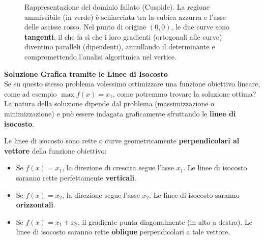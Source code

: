 \documentclass[12pt, a4paper]{article}
\begin{document}
	\begin{figure}[H]
		\centering
		\caption{Rappresentazione del dominio fallato (Cuspide). La regione ammissibile (in verde) è schiacciata tra la cubica azzurra e l'asse delle ascisse rosso. Nel punto di origine $(0,0)$, le due curve sono \textbf{tangenti}, il che fa sì che i loro gradienti (ortogonali alle curve) diventino paralleli (dipendenti), annullando il determinante e compromettendo l'analisi algoritmica nel vertice.}
	\end{figure}
	
	\vspace{0.4cm}
	\textbf{Soluzione Grafica tramite le Linee di Isocosto}\\
	Se su questo stesso problema volessimo ottimizzare una funzione obiettivo lineare, come ad esempio $\max f(x) = x_1$, come potremmo trovare la soluzione ottima?
	La natura della soluzione dipende dal problema (massimizzazione o minimizzazione) e può essere indagata graficamente sfruttando le \textbf{linee di isocosto}.
	
	Le linee di isocosto sono rette o curve geometricamente \textbf{perpendicolari al vettore} della funzione obiettivo:
	\begin{itemize}
		\item Se $f(x) = x_1$, la direzione di crescita segue l'asse $x_1$. Le linee di isocosto saranno rette perfettamente \textbf{verticali}.
		\item Se $f(x) = x_2$, la direzione segue l'asse $x_2$. Le linee di isocosto saranno \textbf{orizzontali}.
		\item Se $f(x) = x_1 + x_2$, il gradiente punta diagonalmente (in alto a destra). Le linee di isocosto saranno rette \textbf{oblique} perpendicolari a tale vettore.
	\end{itemize}
	
\end{document}
